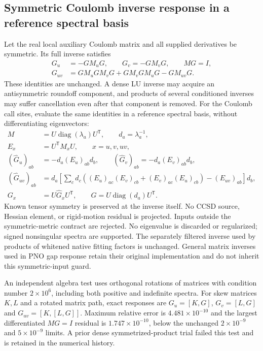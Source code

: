 \documentclass[11pt]{article}
\begin{document}
\subsection{Symmetric Coulomb inverse response in a reference spectral basis}
Let the real local auxiliary Coulomb matrix and all supplied derivatives
be symmetric. Its full inverse satisfies
\begin{align}
 G_u&=-GM_uG,\qquad G_v=-GM_vG,\qquad MG=I,\\
 G_{uv}&=GM_uGM_vG+GM_vGM_uG-GM_{uv}G.
\end{align}
These identities are unchanged. A dense LU inverse may acquire an
antisymmetric roundoff component, and products of several conditioned
inverses may suffer cancellation even after that component is removed.
For the Coulomb call sites, evaluate the same identities in a reference
spectral basis, without differentiating eigenvectors:
\begin{align}
 M&=U\operatorname{diag}(\lambda_a)U^{\mathsf T},\qquad d_a=\lambda_a^{-1},\\
 E_x&=U^{\mathsf T} M_xU,\qquad x=u,v,uv,\\
 (\widehat G_u)_{ab}&=-d_a(E_u)_{ab}d_b,\qquad
 (\widehat G_v)_{ab}=-d_a(E_v)_{ab}d_b,\\
 (\widehat G_{uv})_{ab}
 &=d_a\left[\sum_c d_c\left((E_u)_{ac}(E_v)_{cb}
 +(E_v)_{ac}(E_u)_{cb}\right)-(E_{uv})_{ab}\right]d_b,\\
 G_x&=U\widehat G_xU^{\mathsf T},\qquad G=U\operatorname{diag}(d_a)U^{\mathsf T}.
\end{align}
Known tensor symmetry is preserved at the inverse itself. No CCSD source,
Hessian element, or rigid-motion residual is projected. Inputs outside
the symmetric-metric contract are rejected. No eigenvalue is discarded
or regularized; signed nonsingular spectra are supported. The separately
filtered inverse used by products of whitened native fitting factors is
unchanged. General matrix inverses used in PNO gap response retain their
original implementation and do not inherit this symmetric-input guard.

An independent algebra test uses orthogonal rotations of matrices with
condition number $2\times10^6$, including both positive and indefinite
spectra. For skew matrices $K,L$ and a rotated matrix path, exact
responses are $G_u=[K,G]$, $G_v=[L,G]$ and
$G_{uv}=[K,[L,G]]$. Maximum relative error is
$4.481\times10^{-10}$ and the largest differentiated $MG=I$ residual is
$1.747\times10^{-10}$, below the unchanged $2\times10^{-9}$ and
$5\times10^{-9}$ limits. A prior dense symmetrized-product trial failed
this test and is retained in the numerical history.
\end{document}
